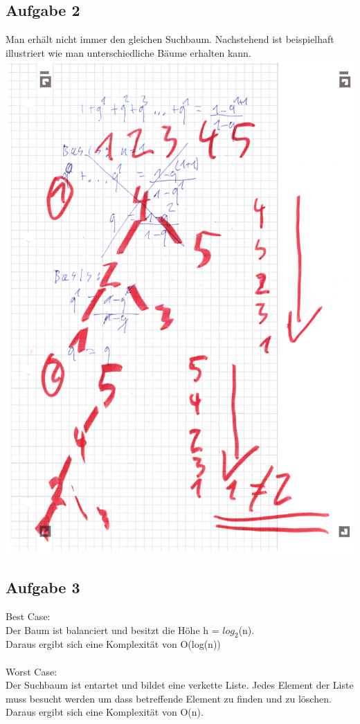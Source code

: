 \documentclass{article}
\begin{document}
	\subsection*{Aufgabe 2}
	Man erhält nicht immer den gleichen Suchbaum. Nachstehend ist beispielhaft illustriert wie man unterschiedliche Bäume erhalten kann. \\
	\includegraphics[width=\linewidth]{090103}
	\subsection*{Aufgabe 3}
	Best Case: \\
	Der Baum ist balanciert und besitzt die Höhe h = $log_{2}$(n).\\
	Daraus ergibt sich eine Komplexität von O(log(n)) \\ \\
	Worst Case:  \\
	Der Suchbaum ist entartet und bildet eine verkette Liste. Jedes Element der Liste muss besucht werden um dass betreffende Element zu finden und zu löschen. \\
	Daraus ergibt sich eine Komplexität von O(n).
\end{document}
